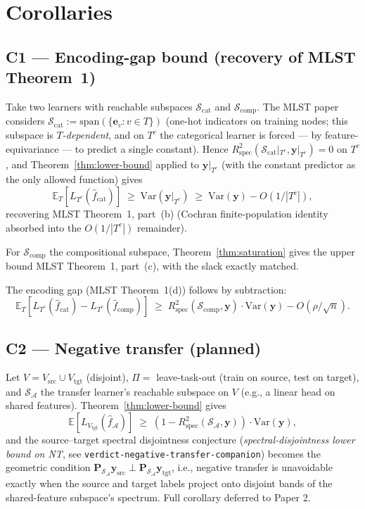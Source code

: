\documentclass[11pt,a4paper]{article}
\theoremstyle{plain}
\theoremstyle{definition}
\theoremstyle{remark}
\newcommand{\by}{\mathbf{y}}
\newcommand{\bP}{\mathbf{P}}
\newcommand{\E}{\mathbb{E}}
\newcommand{\Var}{\mathrm{Var}}
\newcommand{\Rspec}{R^2_{\mathrm{spec}}}
\newcommand{\Scal}{\mathcal{S}}
\newcommand{\Acal}{\mathcal{A}}
\begin{document}
\section{Corollaries}
\label{sec:corollaries}

\subsection{C1 — Encoding-gap bound (recovery of MLST Theorem~1)}
\label{subsec:c1}

Take two learners with reachable subspaces $\Scal_{\mathrm{cat}}$ and
$\Scal_{\mathrm{comp}}$.  The MLST paper considers
$\Scal_{\mathrm{cat}} := \mathrm{span}(\{\mathbf{e}_v : v \in T\})$
(one-hot indicators on training nodes; this subspace is \emph{$T$-dependent},
and on $T^c$ the categorical learner is forced — by feature-equivariance
— to predict a single constant).  Hence
$\Rspec(\Scal_{\mathrm{cat}}|_{T^c}, \by|_{T^c}) = 0$ on $T^c$, and
Theorem~\ref{thm:lower-bound} applied to $\by|_{T^c}$ (with the constant
predictor as the only allowed function) gives
\begin{equation}
    \E_T[L_{T^c}(\hat f_{\mathrm{cat}})]
    \;\geq\; \Var(\by|_{T^c})
    \;\geq\; \Var(\by) - O(1/|T^c|),
\end{equation}
recovering MLST Theorem~1, part~(b) (Cochran finite-population identity
absorbed into the $O(1/|T^c|)$ remainder).

For $\Scal_{\mathrm{comp}}$ the compositional subspace, Theorem~\ref{thm:saturation}
gives the upper bound MLST Theorem~1, part~(c), with the slack exactly matched.

The encoding gap (MLST Theorem~1(d)) follows by subtraction:
\begin{equation}
    \E_T[L_{T^c}(\hat f_{\mathrm{cat}}) - L_{T^c}(\hat f_{\mathrm{comp}})]
    \;\geq\; \Rspec(\Scal_{\mathrm{comp}}, \by) \cdot \Var(\by) - O(\rho/\sqrt{n}).
\end{equation}

\subsection{C2 — Negative transfer (planned)}
\label{subsec:c2}

Let $V = V_{\mathrm{src}} \cup V_{\mathrm{tgt}}$ (disjoint), $\Pi =$
leave-task-out (train on source, test on target), and $\Scal_\Acal$ the
transfer learner's reachable subspace on $V$ (e.g., a linear head on
shared features).  Theorem~\ref{thm:lower-bound} gives
\begin{equation}
    \E[L_{V_{\mathrm{tgt}}}(\hat f_\Acal)]
    \;\geq\; (1 - \Rspec(\Scal_\Acal, \by)) \cdot \Var(\by),
\end{equation}
and the source--target spectral disjointness conjecture
(\emph{spectral-disjointness lower bound on NT}, see
\texttt{verdict-negative-transfer-companion}) becomes the geometric
condition $\bP_{\Scal_\Acal} \by_{\mathrm{src}} \perp \bP_{\Scal_\Acal}
\by_{\mathrm{tgt}}$, i.e., negative transfer is unavoidable exactly when
the source and target labels project onto disjoint bands of the
shared-feature subspace's spectrum.  Full corollary deferred to Paper 2.
\end{document}
